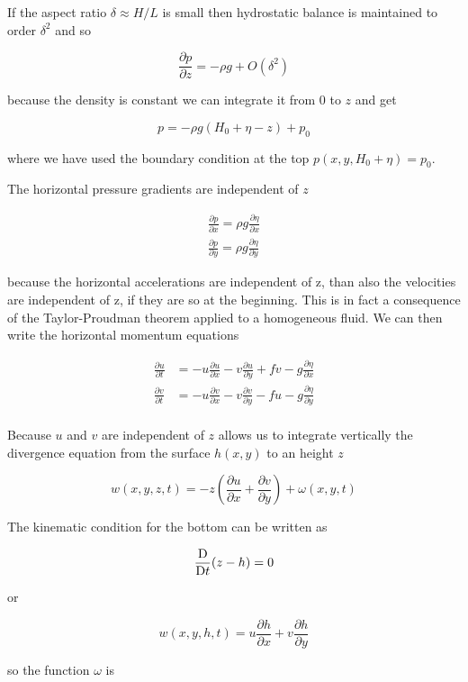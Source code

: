 If the aspect ratio \(\delta \approx H/L\) is small then hydrostatic
balance is maintained to order \(\delta^2\) and so

\[\frac{\partial p}{\partial z} = - \rho g + O(\delta^2)\]

because the density is constant we can integrate it from 0 to \(z\) and
get

\[p = -\rho g (H_0+ \eta -z) + p_0\]

where we have used the boundary condition at the top
\(p(x,y,H_0 +\eta) = p_0\).

The horizontal pressure gradients are independent of \(z\)

\[\begin{aligned}
		\frac{\partial p}{\partial x} = \rho g \frac{\partial \eta}{\partial x} \\
		\frac{\partial p}{\partial y} = \rho g \frac{\partial \eta}{\partial y}
	\end{aligned}\]

because the horizontal accelerations are independent of z, than also the
velocities are independent of z, if they are so at the beginning. This
is in fact a consequence of the Taylor-Proudman theorem applied to a
homogeneous fluid. We can then write the horizontal momentum equations

\[\begin{aligned}
		\frac{\partial u}{\partial t} & = -u \frac{\partial u}{\partial x} -v \frac{\partial u}{\partial y} + f v -g\frac{\partial \eta}{\partial x} \\
		\frac{\partial v}{\partial t} & = -u \frac{\partial v}{\partial x} -v \frac{\partial v}{\partial y} - f u -g\frac{\partial \eta}{\partial y} \\
	\end{aligned}\]

Because \(u\) and \(v\) are independent of \(z\) allows us to integrate
vertically the divergence equation from the surface \(h(x,y)\) to an
height \(z\)

\[w(x,y,z,t) = -z\left(\frac{\partial u}{\partial x} + \frac{\partial v}{\partial y}\right) + \omega(x,y,t)\]

The kinematic condition for the bottom can be written as

\[\frac{\mathrm{D} }{\mathrm{D}t}{(z-h)} = 0\]

or

\[w(x,y,h,t) =  u\frac{\partial h}{\partial x} + v\frac{\partial h}{\partial y}\]

so the function \(\omega\) is


